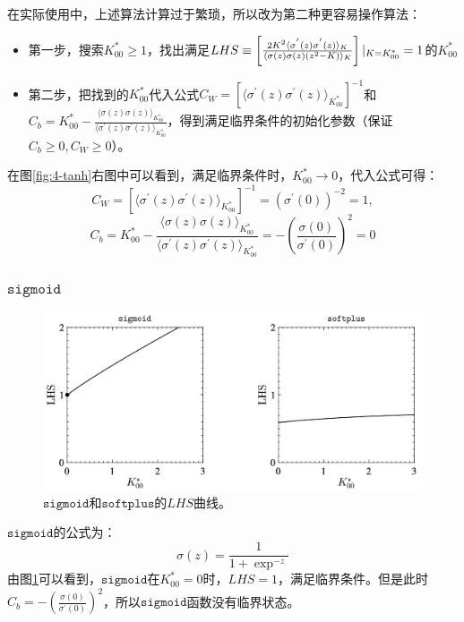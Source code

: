 在实际使用中，上述算法计算过于繁琐，所以改为第二种更容易操作算法：
\begin{itemize}
    \item 第一步，搜索$K_{00}^{*}\ge1$，找出满足$LHS\equiv\left[\frac{2K^2 \langle\sigma^{'}(z)\sigma^{'}(z)\rangle_K}{\langle\sigma(z)\sigma(z)(z^2-K)\rangle_K}\right]\arrowvert_{K=K_{00}^*}=1$的$K_{00}^{*}$
    \item 第二步，把找到的$K_{00}^{*}$代入公式$C_W=[\langle\sigma^{'}(z)\sigma^{'}(z)\rangle_{K_{00}^*}]^{-1}$和$C_b=K_{00}^*-\frac{\langle\sigma(z)\sigma(z)\rangle_{K_{00}^*}}{\langle\sigma^{'}(z)\sigma^{'}(z)\rangle_{K_{00}^*}}$，得到满足临界条件的初始化参数（保证$C_b\ge0, C_W\ge 0$）。
\end{itemize}
在图\ref{fig:4-tanh}右图中可以看到，满足临界条件时，$K_{00}^*\to0$，代入公式可得：
\begin{equation}
    C_W=\left[\langle\sigma^{'}(z)\sigma^{'}(z)\rangle_{K_{00}^*}\right]^{-1}=(\sigma^{'}(0))^{-2}=1,
\end{equation}
\begin{equation} 
    C_b=K_{00}^*-\frac{\langle\sigma(z)\sigma(z)\rangle_{K_{00}^*}}{\langle\sigma^{'}(z)\sigma^{'}(z)\rangle_{K_{00}^*}}=-\left(\frac{\sigma(0)}{\sigma^{'}(0)}\right)^2=0
\end{equation}

\subsubsection{$\texttt{sigmoid}$}
\begin{figure}[!ht]
    \includegraphics[width=\textwidth]{images/4_sigmoid_softplus.bmp}
    \caption{
        $\texttt{sigmoid}$和$\texttt{softplus}$的$LHS$曲线。
    }
    \label{fig:4-sigmoid}
\end{figure}
$\texttt{sigmoid}$的公式为：
\begin{equation}
    \sigma(z)=\frac{1}{1+\exp^{-z}}
\end{equation}
由图\ref{fig:4-sigmoid}可以看到，$\texttt{sigmoid}$在$K_{00}^*=0$时，$LHS=1$，满足临界条件。但是此时$C_b=-\left(\frac{\sigma(0)}{\sigma^{'}(0)}\right)^2$，所以$\texttt{sigmoid}$函数没有临界状态。

